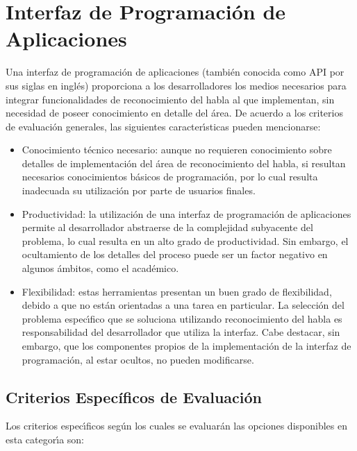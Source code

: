 \section{Interfaz de Programaci\'on de Aplicaciones}
\label{apis}


Una interfaz de programaci\'on de aplicaciones (tambi\'en conocida como API por sus siglas en ingl\'es)
proporciona a los desarrolladores los medios necesarios para integrar funcionalidades de
reconocimiento del habla al  que implementan, sin necesidad de poseer
conocimiento en detalle del \'area. De acuerdo a los criterios de evaluaci\'on generales, las
siguientes caracter{\'\i}sticas pueden mencionarse:

\begin{itemize}
 	\item Conocimiento t\'ecnico necesario: aunque no requieren conocimiento sobre detalles de implementaci\'on
 	del \'area de reconocimiento del habla, si resultan necesarios conocimientos b\'asicos de
 	programaci\'on, por lo cual resulta inadecuada su utilizaci\'on por parte de usuarios finales.
 	\item Productividad: la utilizaci\'on de una interfaz de programaci\'on de aplicaciones permite
 	al desarrollador abstraerse de la complejidad subyacente del problema, lo cual resulta en
 	un alto grado de productividad. Sin embargo, el ocultamiento de los detalles del proceso
 	puede ser un factor negativo en algunos \'ambitos, como el acad\'emico.
 	\item Flexibilidad: estas herramientas presentan un buen grado de flexibilidad, debido a
 	que no est\'an orientadas a una tarea en particular. La selecci\'on del problema espec{\'\i}fico
 	que se soluciona utilizando reconocimiento del habla es responsabilidad del desarrollador
 	que utiliza la interfaz. Cabe destacar, sin embargo, que los componentes propios de la
 	implementaci\'on de la interfaz de programaci\'on, al estar ocultos, no
 	pueden modificarse.
 \end{itemize}


\subsection{Criterios Espec\'ificos de Evaluaci\'on}

Los criterios espec{\'\i}ficos seg\'un los cuales se evaluar\'an las opciones disponibles en esta
categor{\'\i}a son:

